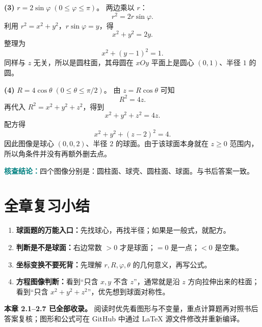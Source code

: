 \documentclass[UTF8,a4paper,11pt,fontset=none]{ctexart}
\newcommand{\ans}[1]{\par\noindent\textcolor{teal}{\sffamily\bfseries 核查结论：}#1\par}
\newcommand{\tip}[1]{\begin{tcolorbox}[colback=light,colframe=rulegray,boxrule=0.4pt,arc=1.5mm,left=3mm,right=3mm,top=2mm,bottom=2mm]#1\end{tcolorbox}}
\begin{document}
\textbf{(3) }$r=2\sin\varphi\;(0\le \varphi\le \pi)$。
两边乘以 $r$：
\[
 r^2=2r\sin\varphi.
\]
利用 $r^2=x^2+y^2$，$r\sin\varphi=y$，得
\[
 x^2+y^2=2y.
\]
整理为
\[
 x^2+(y-1)^2=1.
\]
同样与 $z$ 无关，所以是圆柱面，其母圆在 $xOy$ 平面上是圆心 $(0,1)$、半径 $1$ 的圆。

\textbf{(4) }$R=4\cos\theta\;(0\le \theta\le \pi/2)$。
由 $z=R\cos\theta$ 可知
\[
 R^2=4z.
\]
再代入 $R^2=x^2+y^2+z^2$，得到
\[
 x^2+y^2+z^2=4z.
\]
配方得
\[
 x^2+y^2+(z-2)^2=4.
\]
因此图像是球心 $(0,0,2)$、半径 $2$ 的球面。由于该球面本身就在 $z\ge 0$ 范围内，所以角条件并没有再额外删去点。
\ans{四个图像分别是：圆柱面、球壳、圆柱面、球面。与书后答案一致。}

\clearpage

\clearpage

\clearpage

\clearpage

\clearpage

\clearpage

\clearpage
\section*{全章复习小结}
\begin{enumerate}
\item \textbf{球面题的万能入口：}先找球心，再找半径；如果是一般式，就配方。
\item \textbf{判断是不是球面：}右边常数 $>0$ 才是球面；$=0$ 是一点；$<0$ 是空集。
\item \textbf{坐标变换不要死背：}先理解 $r,R,\varphi,\theta$ 的几何意义，再写公式。
\item \textbf{方程图像判断：}看到“只含 $x,y$ 不含 $z$”，通常就是沿 $z$ 方向拉伸出来的柱面；看到“只含 $x^2+y^2+z^2$”，优先想到球面对称性。
\end{enumerate}
\tip{\textbf{本章 2.1--2.7 已全部收录。} 阅读时优先看图形与不变量，重点计算题再对照书后答案复核；图形和公式可在 GitHub 中通过 LaTeX 源文件修改并重新编译。}
\end{document}
